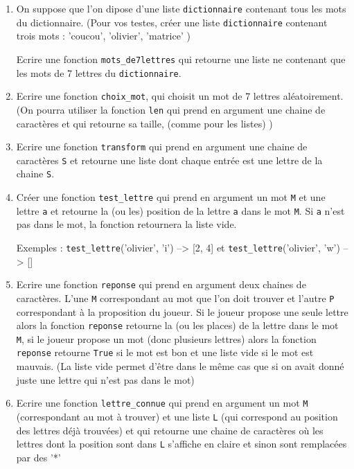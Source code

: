 \begin{exercice}


\begin{enumerate}
\item On suppose que l'on dipose d'une liste \texttt{dictionnaire} contenant tous les mots du dictionnaire. (Pour vos testes, créer une liste  \texttt{dictionnaire} contenant trois mots : 'coucou', 'olivier', 'matrice' )

Ecrire une fonction \texttt{mots\_de7lettres} qui retourne une liste ne contenant que les mots de 7 lettres du \texttt{dictionnaire}.

\item Ecrire une fonction \texttt{choix\_mot}, qui choisit un mot de 7 lettres aléatoirement.
(On pourra utiliser la fonction \texttt{len} qui prend en argument une chaine de caractères et qui retourne sa taille, (comme pour les listes) ) 

\item Ecrire une fonction \texttt{transform} qui prend en argument une chaine de caractères \texttt{S} et retourne une liste dont chaque entrée est une lettre de la chaine \texttt{S}.

\item Créer une fonction \texttt{test\_lettre} qui prend en argument un mot \texttt{M} et une lettre \texttt{a} et retourne la (ou les) position de la lettre \texttt{a} dans le mot \texttt{M}. Si \texttt{a} n'est pas dans le mot, la fonction retournera la liste vide. 

Exemples : \texttt{test\_lettre}('olivier', 'i') --> [2, 4] et \texttt{test\_lettre}('olivier', 'w') --> []

\item Ecrire une fonction  \texttt{reponse} qui prend en argument deux chaines de caractères. L'une \texttt{M} correspondant au mot que l'on doit trouver et l'autre \texttt{P} correspondant à la proposition du joueur. Si le joueur propose une seule lettre alors  la fonction \texttt{reponse}  retourne la (ou les places) de la lettre dans le mot \texttt{M}, si le joueur propose un mot (donc plusieurs lettres) alors la fonction \texttt{reponse} retourne \texttt{True} si le mot est bon et une liste vide si le mot est mauvais. (La liste vide permet d'être dans le même cas que si on avait donné juste une lettre qui n'est pas dans le mot) 

\item Ecrire une fonction \texttt{lettre\_connue} qui prend en argument un mot \texttt{M}  (correspondant au mot à trouver) et une liste \texttt{L}  (qui correspond au position des lettres déjà trouvées) et qui retourne une chaine de caractères où les lettres dont la position sont dans \texttt{L} s'affiche en claire et sinon sont remplacées par des '*'


\end{enumerate}
\end{exercice}

